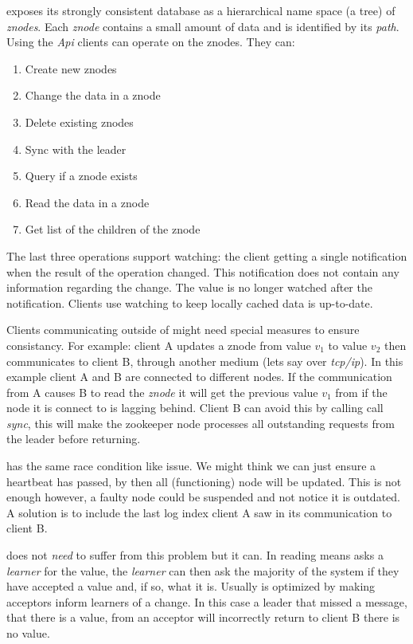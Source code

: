 \zookeeper{} exposes its strongly consistent database as a hierarchical name space (a tree) of \textsl{znodes}. Each \textsl{znode} contains a small amount of data and is identified by its \textsl{path}. Using the \textsl{Api} clients can operate on the znodes. They can: 
%
\begin{multicols}{2}
\begin{enumerate}
	\item Create new znodes
	\item Change the data in a znode
	\item Delete existing znodes
	\item Sync with the leader
	\item Query if a znode exists
	\item Read the data in a znode
	\item Get list of the children of the znode
\end{enumerate}
\end{multicols}
%
The last three operations support watching: the client getting a single notification when the result of the operation changed. This notification does not contain any information regarding the change. The value is no longer watched after the notification. Clients use watching to keep locally cached data is up-to-date. 

Clients communicating outside of \zookeeper{} might need special measures to ensure consistancy. For example: client A updates a znode from value $v_1$ to value $v_2$ then communicates to client B, through another medium (lets say over \textsl{tcp/ip}). In this example client A and B are connected to different \zookeeper{} nodes. If the communication from A causes B to read the \textsl{znode} it will get the previous value $v_1$ from \zookeeper{} if the node it is connect to is lagging behind. Client B can avoid this by calling call \textit{sync}, this will make the zookeeper node processes all outstanding requests from the leader before returning.

\raft{} has the same race condition like issue. We might think we can just ensure a heartbeat has passed, by then all (functioning) node will be updated. This is not enough however, a faulty node could be suspended and not notice it is outdated. A solution is to include the last log index client A saw in its communication to client B. 

\paxos{} does not \textit{need} to suffer from this problem but it can. In \paxos{} reading means asks a \textit{learner} for the value, the \textit{learner} can then ask the majority of the system if they have accepted a value and, if so, what it is. Usually \paxos{} is optimized by making acceptors inform learners of a change. In this case a leader that missed a message, that there is a value, from an acceptor will incorrectly return to client B there is no value.
